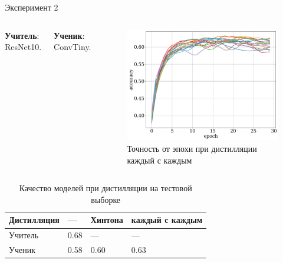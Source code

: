 \documentclass{beamer}
\begin{document}
\begin{frame}{Эксперимент 2}
    \begin{columns}[c]
        \textbf{Учитель}: ResNet10.

        \textbf{Ученик}: ConvTiny.

        \begin{figure}
            \includegraphics[width=1.0\textwidth]{resnet10_tiny.png}
            \caption{Точность от эпохи при дистилляции каждый с каждым}
        \end{figure}
    \end{columns}

    \begin{table}[h!]
        \centering
        \begin{tabular}{|l|l|l|l|}
            \hline
            Дистилляция & ---  & Хинтона & каждый с каждым \\ \hline
            Учитель     & 0.68 & ---     & ---             \\ \hline
            Ученик      & 0.58 & 0.60    & 0.63            \\ \hline
        \end{tabular}
        \caption{Качество моделей при дистилляции на тестовой выборке}
    \end{table}
\end{frame}

\end{document}
